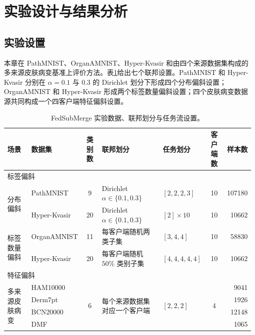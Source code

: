\section{实验设计与结果分析}
\label{sec:fedsubmerge-experiments}

\subsection{实验设置}
\label{subsec:fedsubmerge-experimental-setup}

本章在 PathMNIST、OrganAMNIST、Hyper-Kvasir 和由四个来源数据集构成的多来源皮肤病变基准上评价方法\cite{yang2023medmnist,borgli2020hyperkvasir,tschandl2018ham10000,kawahara2019derm7pt,combalia2019bcn20000,ballerini2013dermofit}。表\ref{tab:fedsubmerge-setup}给出七个联邦设置。PathMNIST 和 Hyper-Kvasir 分别在 $\alpha=0.1$ 与 $0.3$ 的 Dirichlet 划分下形成四个分布偏斜设置；OrganAMNIST 和 Hyper-Kvasir 形成两个标签数量偏斜设置；四个皮肤病变数据源共同构成一个四客户端特征偏斜设置。

\begin{table}[htbp]
\centering
\caption{FedSubMerge 实验数据、联邦划分与任务流设置。}
\label{tab:fedsubmerge-setup}
\thesistablefont
\setlength{\tabcolsep}{3pt}
\renewcommand{\arraystretch}{1.15}
\begin{tabular}{@{}p{1.4cm}p{2.55cm}cp{3.1cm}p{1.85cm}cr@{}}
\toprule
场景 & 数据集 & 类别数 & 联邦划分 & 任务划分 & 客户端数 & 样本数 \\
\midrule
\multicolumn{7}{l}{标签偏斜} \\
\multirow{2}{1.4cm}{分布偏斜} & PathMNIST & 9 & Dirichlet $\alpha\in\{0.1,0.3\}$ & $[2,2,2,3]$ & 10 & 107180 \\
& Hyper-Kvasir & 20 & Dirichlet $\alpha\in\{0.1,0.3\}$ & $[2]\times10$ & 10 & 10662 \\
\multirow{2}{1.4cm}{标签数量偏斜} & OrganAMNIST & 11 & 每客户端随机两类子集 & $[3,4,4]$ & 10 & 58830 \\
& Hyper-Kvasir & 20 & 每客户端随机 $50\%$ 类别子集 & $[4,4,4,4,4]$ & 10 & 10662 \\
\midrule
\multicolumn{7}{l}{特征偏斜} \\
\multirow{4}{1.4cm}{多来源皮肤病变} & HAM10000 & \multirow{4}{*}{6} & \multirow{4}{3.1cm}{每个来源数据集对应一个客户端} & \multirow{4}{*}{$[2,2,2]$} & \multirow{4}{*}{4} & 9041 \\
& Derm7pt & & & & & 1926 \\
& BCN20000 & & & & & 12148 \\
& DMF & & & & & 1065 \\
\bottomrule
\end{tabular}%

\end{table}


